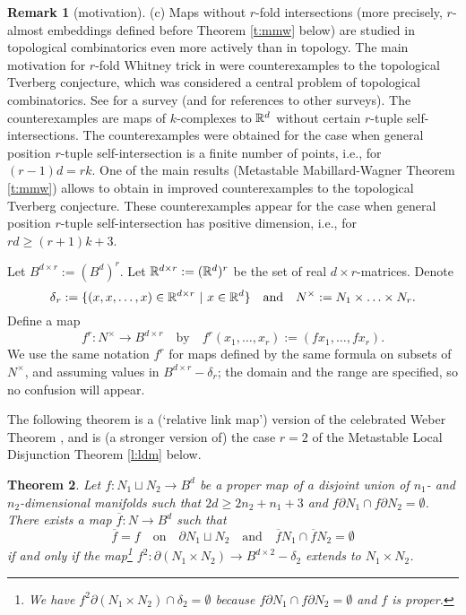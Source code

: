 \documentclass[12pt]{article}
\def\diag{\delta}
\theoremstyle{plain}
\newtheorem{Theorem}{Theorem}[section]
\theoremstyle{definition}
\newtheorem{Remark}[Theorem]{Remark}
\begin{document}
\begin{Remark}[motivation]
(c) Maps without $r$-fold intersections (more precisely, $r$-almost embeddings defined before Theorem \ref{t:mmw} below) are studied in topological combinatorics even more actively than in topology.
The main motivation for $r$-fold Whitney trick in \cite{MW15, AMSW, MW16} were counterexamples
to the topological Tverberg conjecture, which was considered a central problem of topological combinatorics.
See \cite{Sk16} for a survey (and for references to other surveys).
The counterexamples are maps of $k$-complexes to ${\mathbb R}^d$ without certain $r$-tuple self-intersections.
The counterexamples were obtained for the case when general position $r$-tuple self-intersection is a finite number  of points, i.e., for $(r-1)d=rk$.
One of the main results (Metastable Mabillard-Wagner Theorem \ref{t:mmw}) allows to obtain in \cite{AKS} improved counterexamples to the topological Tverberg conjecture.
These counterexamples appear for the case when general position $r$-tuple self-intersection has positive dimension, i.e., for $rd\ge(r+1)k+3$.
\end{Remark}

Let $B^{d\times r}:=(B^d)^r$.
Let ${\mathbb R}^{d\times r}:=({\mathbb R}^d)^r$ be the set of real $d\times r$-matrices.
Denote
$$
\diag\phantom{}_r:=\{(x,x,\ldots,x)\in \R^{d\times r}\ |\ x\in\R^d\}\quad\text{and}\quad N^\times:=N_1\times\ldots\times N_r.$$
Define a map
$$f^r:N^\times\to B^{d\times r}\quad\text{by}\quad f^r(x_1,\ldots,x_r):=(fx_1,\ldots,fx_r).$$
We use the same notation $f^r$ for maps defined by the same formula on subsets of $N^\times$,
and assuming values in $B^{d\times r}-\diag_r$; the domain and the range are specified, so no confusion will appear.

The following theorem is a (`relative link map') version of the celebrated Weber Theorem 
\cite[the Weber Theorem 8.1]{Sk06}, and is (a stronger version of) the case $r=2$ 
of the Metastable Local Disjunction Theorem \ref{l:ldm} below.

\begin{Theorem}\label{t:hawe}
Let $f:N_1\sqcup N_2\to B^d$ be a proper map of a disjoint union of $n_1$- and $n_2$-dimensional manifolds such that $2d\ge2n_2+n_1+3$ and $f\partial N_1\cap f\partial N_2=\emptyset$.
There exists a map $\overline f:N\to B^d$ such that
$$\overline f=f \quad\text{on}\quad \partial N_1\sqcup N_2\quad\text{and}\quad
\overline fN_1\cap \overline fN_2=\emptyset$$
if and only if the map\footnote{We have $f^2\partial(N_1\times N_2)\cap\diag_2=\emptyset$ because $f\partial N_1\cap f\partial N_2=\emptyset$ and $f$ is proper.}
$f^2:\partial(N_1\times N_2)\to B^{d\times 2}-\diag_2$ extends to $N_1\times N_2$.
\end{Theorem}
\end{document}
